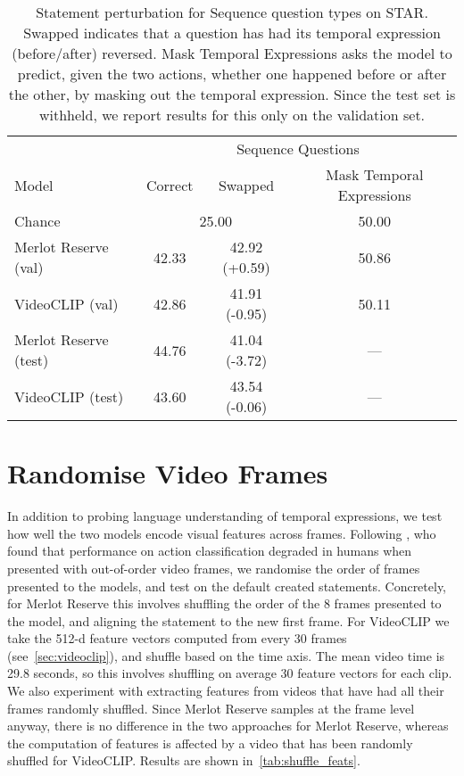 \begin{table}[tp]
    \centering
	\caption{Statement perturbation for Sequence question types on STAR.
	Swapped indicates that a question has had its temporal expression
	(before/after) reversed. Mask Temporal Expressions asks the model to
	predict, given the two actions, whether one happened before or after
	the other, by masking out the temporal expression. Since the test set
	is withheld, we report results for this only on the validation set.}
    \label{tab:swap_star}
    \begin{tabular}{lccc}
        \toprule
        \multicolumn{1}{c}{}     & \multicolumn{3}{c}{Sequence Questions} \\
                                   \cmidrule(){2-4}
        Model          & Correct & Swapped & Mask Temporal Expressions\\
        \cmidrule(r){1-1} \cmidrule(){2-3} \cmidrule(l){4-4}
		Chance				  & \multicolumn{2}{c}{25.00} & 50.00 \\
        \cmidrule(r){1-1} \cmidrule(){2-3} \cmidrule(l){4-4}
        Merlot Reserve (val)  & 42.33   & 42.92 (+0.59)  & 50.86 \\
        VideoCLIP (val)       & 42.86   & 41.91 (-0.95)  & 50.11 \\
        \cmidrule(r){1-1} \cmidrule(){2-3} \cmidrule(l){4-4}
        Merlot Reserve (test) & 44.76   & 41.04 (-3.72)  & {---} \\
        VideoCLIP (test)      & 43.60   & 43.54 (-0.06)  &  {---} \\
        \bottomrule
    \end{tabular}
\end{table}

\section{Randomise Video Frames}

In addition to probing language understanding of temporal expressions, we test
how well the two models encode visual features across frames. Following
\citet{sevilla-lara2021temporal}, who found that performance on action
classification degraded in humans when presented with out-of-order video
frames, we randomise the order of frames presented to the models, and test on
the default created statements. Concretely, for Merlot Reserve this involves
shuffling the order of the 8 frames presented to the model, and aligning the
statement to the new first frame. For VideoCLIP we take the 512-d feature
vectors computed from every 30 frames (see~\cref{sec:videoclip}), and shuffle
based on the time axis. The mean video time is 29.8 seconds, so this involves
shuffling on average 30 feature vectors for each clip. We also experiment with
extracting features from videos that have had all their frames randomly
shuffled. Since Merlot Reserve samples at the frame level anyway, there is no
difference in the two approaches for Merlot Reserve, whereas the computation of
features is affected by a video that has been randomly shuffled for VideoCLIP.
Results are shown in~\cref{tab:shuffle_feats}.

